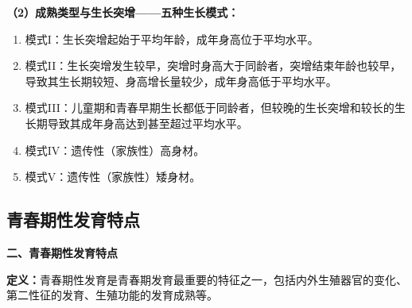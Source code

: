 \begin{keybox}
\textbf{（2）成熟类型与生长突增——五种生长模式：}
\begin{enumerate}[leftmargin=*]
    \item 模式I：生长突增起始于平均年龄，成年身高位于平均水平。
    \item 模式II：生长突增发生较早，突增时身高大于同龄者，突增结束年龄也较早，导致其生长期较短、身高增长量较少，成年身高低于平均水平。
    \item 模式III：儿童期和青春早期生长都低于同龄者，但较晚的生长突增和较长的生长期导致其成年身高达到甚至超过平均水平。
    \item 模式IV：遗传性（家族性）高身材。
    \item 模式V：遗传性（家族性）矮身材。
\end{enumerate}

\vspace{3pt}
\begin{center}
\end{center}
\vspace{3pt}
\end{keybox}

\subsection{青春期性发育特点}

\begin{defbox}
\textbf{二、青春期性发育特点}

\textbf{定义：}青春期性发育是青春期发育最重要的特征之一，包括内外生殖器官的变化、第二性征的发育、生殖功能的发育成熟等。
\end{defbox}

